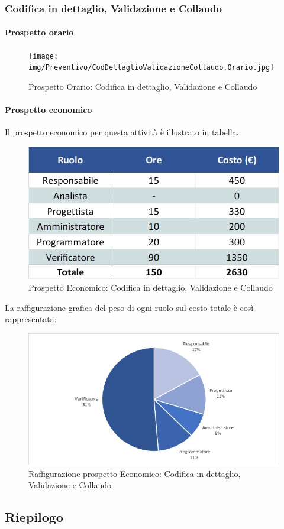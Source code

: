 \subsubsection{Codifica in dettaglio, Validazione e Collaudo}
\paragraph{Prospetto orario}
\begin{figure}[h!]
	\centerline{\texttt{[image: img/Preventivo/CodDettaglioValidazioneCollaudo.Orario.jpg]}}
	\caption{Prospetto Orario: Codifica in dettaglio, Validazione e Collaudo}
\end{figure}
\paragraph{Prospetto economico}
Il prospetto economico per questa attività è illustrato in tabella. 
\begin{figure}[h!]
	\centerline{\includegraphics[scale=0.4]{img/Preventivo/CodDettaglioValidazioneCollaudo.Economico.jpg}}
	\caption{Prospetto Economico: Codifica in dettaglio, Validazione e Collaudo}
\end{figure}
La raffigurazione grafica del peso di ogni ruolo sul costo totale è così rappresentata: 
\begin{figure}[h!]
	\centerline{\includegraphics[scale=0.4]{img/Preventivo/Torte/CodDettaglioValidazioneCollaudo.jpg}}
	\caption{Raffigurazione prospetto Economico: Codifica in dettaglio, Validazione e Collaudo}
\end{figure} 

\subsection{Riepilogo}